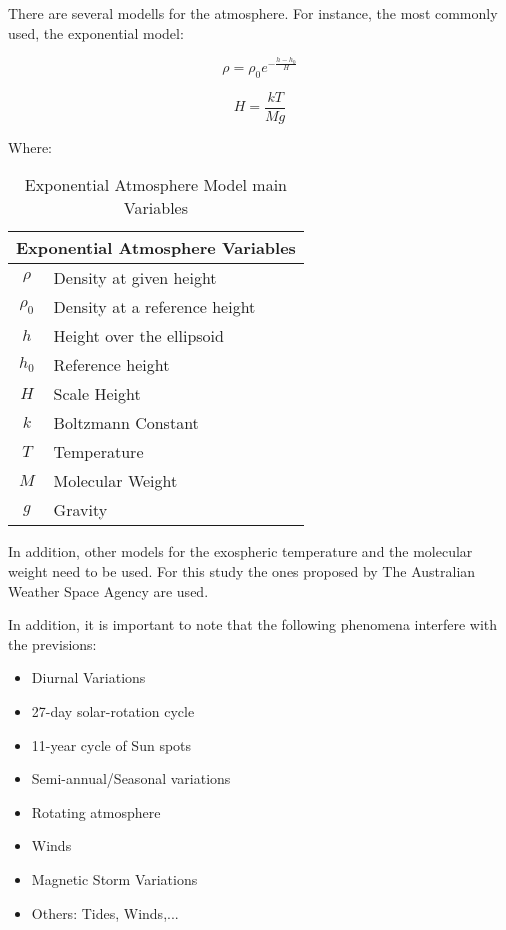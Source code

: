 There are several modells for the atmosphere. For instance, the most commonly used, the exponential model:

\begin{equation}
\rho = \rho_{0} e^{-\frac{h-h_{0}}{H}}
\end{equation}

\begin{equation}
H = \frac{kT}{Mg}
\end{equation}

Where:

\begin{table}[H]
\centering
\begin{tabular}{|c|l|}
\hline
\multicolumn{2}{|c|}{Exponential Atmosphere Variables}     \\ \hline
$\rho$             & Density at given height                  \\ \hline
$\rho_{0}$         & Density at a reference height		       \\ \hline
$h$           & Height over the ellipsoid            \\ \hline
$h_{0}$            & Reference height \\ \hline
$H$              & Scale Height      \\ \hline
$k$              & Boltzmann Constant      \\ \hline
$T$              & Temperature      \\ \hline
$M$              & Molecular Weight      \\ \hline
$g$              & Gravity      \\ \hline

\end{tabular}
\caption{Exponential Atmosphere Model main Variables}
\end{table}  

In addition, other models for the exospheric temperature and the molecular weight need to be used. For this study the ones proposed by The Australian Weather Space Agency are used.

In addition, it is important to note that the following phenomena interfere with the previsions:

\begin{itemize}
\item Diurnal Variations
\item 27-day solar-rotation cycle
\item 11-year cycle of Sun spots
\item Semi-annual/Seasonal variations
\item Rotating atmosphere
\item Winds
\item Magnetic Storm Variations
\item Others: Tides, Winds,...
\end{itemize}

